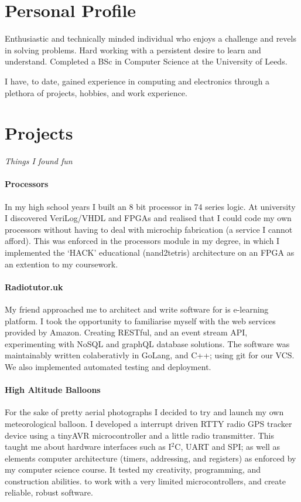 \documentclass[9pt,a4paper]{article}
\begin{document}
\begin{multicols*}{3}
\section*{Personal Profile}
\vspace{-.3cm}
Enthusiastic and technically minded individual who enjoys a challenge and revels in solving problems.
Hard working with a persistent desire to learn and understand.
Completed a BSc in Computer Science at the University of Leeds.

I have, to date, gained experience in computing and electronics through a plethora of projects, hobbies, and work experience.

\section*{Projects}
\vspace*{-.3cm}
\textit{Things I found fun}
\vspace*{-.3cm}

\paragraph{Processors} In my high school years I built an 8 bit processor in 74 series logic.
At university I discovered VeriLog/VHDL and FPGAs and realised that I could code my own processors without having to deal with microchip fabrication (a service I cannot afford).
This was enforced in the processors module in my degree, in which I implemented the `HACK' educational (nand2tetris) architecture on an FPGA as an extention to my coursework.

\paragraph{Radiotutor.uk} My friend approached me to architect and write software for is e-learning platform.
I took the opportunity to familiarise myself with the web services provided by Amazon.
Creating RESTful, and an event stream API, experimenting with NoSQL and graphQL database solutions.
The software was maintainably written colaberativly in GoLang, and C++; using git for our VCS.
We also implemented automated testing and deployment.

\paragraph{High Altitude Balloons} For the sake of pretty aerial photographs I decided to try and launch my own meteorological balloon.
I developed a interrupt driven RTTY radio GPS tracker device using a tinyAVR microcontroller and a little radio transmitter.
This taught me about hardware interfaces such as I$^2$C, UART and SPI;
as well as elements computer architecture (timers, addressing, and registers) as enforced by my computer science course.
It tested my creativity, programming, and construction abilities. to work with a very limited microcontrollers, and create reliable, robust software.


\end{multicols*}
\end{document}

